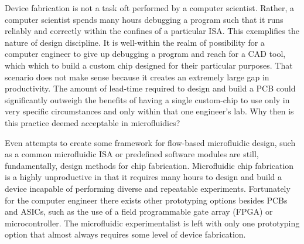 \documentclass[11pt,journal,compsoc, onecolumn]{IEEEtran}
\begin{document}
Device fabrication is not a task oft performed by a computer scientist. Rather,
a computer scientist spends many hours debugging a program such that it runs
reliably and correctly within the confines of a particular ISA. This
exemplifies the nature of design discipline. It is well-within the realm of
possibility for a computer engineer to give up debugging a program and reach
for a CAD tool, which which to build a custom chip designed for their
particular purposes. That scenario does not make sense because it creates an
extremely large gap in productivity. The amount of lead-time required to design
and build a PCB could significantly outweigh the benefits of having a single
custom-chip to use only in very specific circumstances and only within that one
engineer's lab. Why then is this practice deemed acceptable in microfluidics?

Even attempts to create some framework for flow-based microfluidic design, such
as a common microfluidic ISA\cite{amin2009} or predefined software modules
\cite{soe2013} are still, fundamentally, design methods for chip fabrication.
Microfluidic chip fabrication is a highly unproductive in that it requires many
hours to design and build a device incapable of performing diverse and repeatable
experiments. Fortunately for the computer engineer there exists other prototyping
options besides PCBs and ASICs, such as the use of a field programmable gate
array (FPGA) or microcontroller. The microfluidic experimentalist is left with
only one prototyping option that almost always requires some level of device
fabrication.

\ifCLASSOPTIONcaptionsoff
  \newpage
\fi







\end{document}
